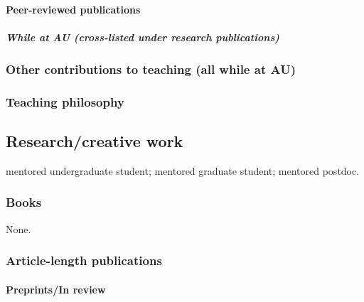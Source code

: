 \paragraph{Peer-reviewed publications}

\subparagraph*{While at AU (cross-listed under research publications)}
\nocite{*}
\printbibliography[filter=cvteachingpapersnopreprints, check=afteraustart, heading=none]

\subsubsection{Other contributions to teaching (all while at AU)}


\subsubsection{Teaching philosophy}


\subsection{Research/creative work}
\ugsymbol{}mentored undergraduate student;
\phdsymbol{}mentored graduate student;
\postdocsymbol{}mentored postdoc.

\subsubsection{Books}
None.

\subsubsection{Article-length publications}



\paragraph{Preprints/In review}
\nocite{*}
\printbibliography[filter=cvsubmitted, heading=none]

